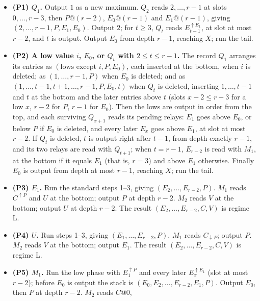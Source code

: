 \documentclass[11pt,letterpaper]{article}
\providecommand{\tightlist}{\setlength{\itemsep}{0pt}\setlength{\parskip}{0pt}}
\begin{document}
\begin{itemize}
\tightlist
\item
  \textbf{(P1) \(Q_1\).} Output \(1\) as a new maximum. \(Q_2\) reads
  \(2,\dots,r-1\) at slots \(0,\dots,r-3\), then \(P@(r-2)\),
  \(E_0@(r-1)\) and \(E_1@(r-1)\), giving \((2,\dots,r-1,P,E_1,E_0)\).
  Output \(2\); for \(t\ge3\), \(Q_t\) reads \(E_{t-1}^{\uparrow E_1}\),
  at slot at most \(r-2\), and \(t\) is output. Output \(E_0\) from
  depth \(r-1\), reaching \(X\); run the tail.
\item
  \textbf{(P2) A low value \(i\), \(E_0\), or \(Q_t\) with
  \(2\le t\le r-1\).} The record \(Q_1\) arranges its entries as
  \((\text{lows except }i,P,E_0)\), each inserted at the bottom, when
  \(i\) is deleted; as \((1,\dots,r-1,P)\) when \(E_0\) is deleted; and
  as \((1,\dots,t-1,t+1,\dots,r-1,P,E_0,t)\) when \(Q_t\) is deleted,
  inserting \(1,\dots,t-1\) and \(t\) at the bottom and the later
  entries above \(t\) (slots \(x-2\le r-3\) for a low \(x\), \(r-2\) for
  \(P\), \(r-1\) for \(E_0\)). Then the lows are output in order from
  the top, and each surviving \(Q_{x+1}\) reads its pending relays:
  \(E_1\) goes above \(E_0\), or below \(P\) if \(E_0\) is deleted, and
  every later \(E_x\) goes above \(E_1\), at slot at most \(r-2\). If
  \(Q_t\) is deleted, \(t\) is output right after \(t-1\), from depth
  exactly \(r-1\), and its two relays are read with \(Q_{t+1}\); when
  \(t=r-1\), \(E_{r-2}\) is read with \(M_1\), at the bottom if it
  equals \(E_1\) (that is, \(r=3\)) and above \(E_1\) otherwise. Finally
  \(E_0\) is output from depth at most \(r-1\), reaching \(X\); run the
  tail.
\item
  \textbf{(P3) \(E_1\).} Run the standard steps 1--3, giving
  \((E_2,\dots,E_{r-2},P)\). \(M_1\) reads \(C^{\uparrow P}\) and \(U\)
  at the bottom; output \(P\) at depth \(r-2\). \(M_2\) reads \(V\) at
  the bottom; output \(U\) at depth \(r-2\). The result
  \((E_2,\dots,E_{r-2},C,V)\) is regime L.
\item
  \textbf{(P4) \(U\).} Run steps 1--3, giving \((E_1,\dots,E_{r-2},P)\).
  \(M_1\) reads \(C_{\downarrow P}\); output \(P\). \(M_2\) reads \(V\)
  at the bottom; output \(E_1\). The result \((E_2,\dots,E_{r-2},C,V)\)
  is regime L.
\item
  \textbf{(P5) \(M_1\).} Run the low phase with \(E_1^{\uparrow P}\) and
  every later \(E_x^{\uparrow E_1}\) (slot at most \(r-2\)); before
  \(E_0\) is output the stack is \((E_0,E_2,\dots,E_{r-2},E_1,P)\).
  Output \(E_0\), then \(P\) at depth \(r-2\). \(M_2\) reads \(C@0\),

\end{itemize}
\end{document}
